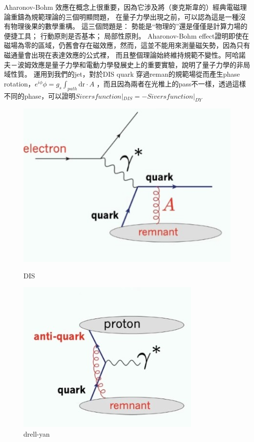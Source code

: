 \documentclass[12pt, a4paper, oneside]{ctexart}
\begin{document}
\begin{spacing}{2.0}
Aharonov-Bohm 效應在概念上很重要，因為它涉及將（麥克斯韋的）經典電磁理論重鑄為規範理論的三個明顯問題，
在量子力學出現之前，可以認為這是一種沒有物理後果的數學重構。 
這三個問題是：
勢能是“物理的”還是僅僅是計算力場的便捷工具；
行動原則是否基本；
局部性原則。
Aharonov-Bohm effect證明即使在磁場為零的區域，仍舊會存在磁效應，然而，這並不能用來測量磁矢勢，因為只有磁通量會出現在表達效應的公式裡，
而且整個理論始終維持規範不變性。阿哈諾夫－波姆效應是量子力學和電動力學發展史上的重要實驗，說明了量子力學的非局域性質。
運用到我們的jet，對於DIS quark 穿過reman的規範場從而產生phase rotation，$e^{i\phi}$$\phi = g_s \int_{path} \mathrm{d r}\cdot A$
，而且因為兩者在光椎上的pass不一樣，透過這樣不同的phase，可以證明$Sivers function|_{DIS} = -Sivers function|_{DY}$


\begin{figure}
    \begin{minipage}[t]{0.5\linewidth}
        \centering
        \includegraphics[scale=0.1]{DIS.jpg}
        \caption{DIS}
        \label{fig:side:a}
      \end{minipage}%
      \begin{minipage}[t]{0.5\linewidth}
        \centering
        \includegraphics[scale=0.3]{drell.jpg}
        \caption{drell-yan}
        \label{fig:side:b}
      \end{minipage}
\end{figure}


\end{spacing}
\end{document}
